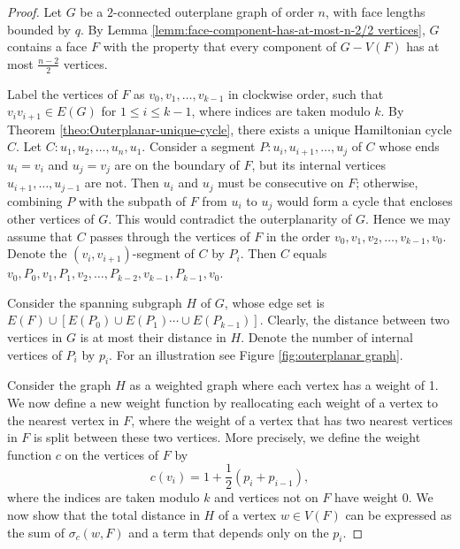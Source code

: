 \documentclass[a4paper,11pt]{article}
\numberwithin{equation}{theorem}
\begin{document}
\begin{proof}
Let $G$ be a $2$-connected outerplane graph of order $n$, with face lengths bounded by $q$. 
By Lemma \ref{lemm:face-component-has-at-most-n-2/2 vertices}, $G$ contains a face $F$ with the property that every component of $G - V(F)$ has at most $\frac{n-2}{2}$ vertices.


Label the vertices of \( F \) as \( v_0, v_1, \ldots, v_{k-1} \) in clockwise order, such that 
\( v_iv_{i+1} \in E(G) \) for \( 1 \leq i \leq k-1 \), where indices are taken modulo $k$. 
By Theorem \ref{theo:Outerplanar-unique-cycle}, there exists a unique Hamiltonian cycle $C$. 
Let $C: u_1, u_2,\ldots,u_n, u_1$. Consider a segment $P: u_i, u_{i+1},\ldots,u_j$ of 
$C$ whose ends $u_i=v_i$ and $u_j=v_j$ are on the boundary of $F$, but its internal vertices $u_{i+1},\ldots,u_{j-1}$ are not. Then \( u_i \) and \( u_j \) must be consecutive on \( F \); otherwise, combining \( P \) with the subpath of \( F \) from \( u_i \) to \( u_j \) would form a cycle that encloses other vertices of \( G \). This would contradict the outerplanarity of \( G \). Hence we may assume that $C$ passes through the vertices of $F$ in the order $v_0, v_1,v_2, \ldots, v_{k-1}, v_0$. Denote the $(v_i, v_{i+1})$-segment of $C$ by $P_i$. Then $C$ equals $v_0,P_0,v_1,P_1,v_2,\ldots, P_{k-2},v_{k-1},P_{k-1},v_0$. 

Consider the spanning subgraph $H$ of $G$, whose edge set is $E(F) \cup \left[E(P_0)\cup E(P_1)\cdots \cup E(P_{k-1})\right]$. Clearly, the distance between two vertices in $G$ is at most their distance in $H$. Denote the number of internal vertices of $P_i$ by $p_i$. For an illustration see Figure \ref{fig:outerplanar graph}. 

Consider the graph \( H \) as a weighted graph where each vertex has a weight of 1. We now define a new weight function by reallocating each weight of a vertex to the nearest vertex in \( F \), where the weight of a vertex that has two nearest vertices in $F$ is split between these two vertices. More precisely, we define the weight function $c$ on the vertices of $F$ by 
\[ c(v_i) = 1 + \frac{1}{2} \left(p_i + p_{i-1}\right), \] where the indices are taken modulo $k$ and vertices not on $F$ have weight $0$. We now show that the total distance in $H$ of a vertex $w \in V(F)$ can be expressed as the sum of $\sigma_c(w,F)$ and a term that depends only on the 
$p_i$.  




\end{proof}
\end{document}
